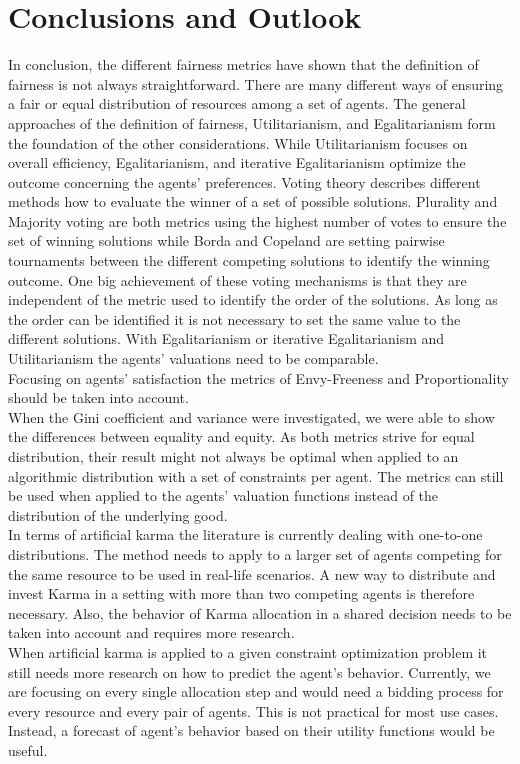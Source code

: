 \documentclass[german, a4paper, 11pt, oneside]{scrbook}
\begin{document}
\chapter{Conclusions and Outlook}
In conclusion, the different fairness metrics have shown that the definition of fairness is not always straightforward. There are many different ways of ensuring a fair or equal distribution of resources among a set of agents. The general approaches of the definition of fairness, Utilitarianism, and Egalitarianism form the foundation of the other considerations. While Utilitarianism focuses on overall efficiency, Egalitarianism, and iterative Egalitarianism optimize the outcome concerning the agents' preferences. Voting theory describes different methods how to evaluate the winner of a set of possible solutions. Plurality and Majority voting are both metrics using the highest number of votes to ensure the set of winning solutions while Borda and Copeland are setting pairwise tournaments between the different competing solutions to identify the winning outcome. One big achievement of these voting mechanisms is that they are independent of the metric used to identify the order of the solutions. As long as the order can be identified it is not necessary to set the same value to the different solutions. With Egalitarianism or iterative Egalitarianism and Utilitarianism the agents' valuations need to be comparable. \\Focusing on agents' satisfaction the metrics of Envy-Freeness and Proportionality should be taken into account.
\\When the Gini coefficient and variance were investigated, we were able to show the differences between equality and equity. As both metrics strive for equal distribution, their result might not always be optimal when applied to an algorithmic distribution with a set of constraints per agent. The metrics can still be used when applied to the agents' valuation functions instead of the distribution of the underlying good.
\\In terms of artificial karma the literature is currently dealing with one-to-one distributions. The method needs to apply to a larger set of agents competing for the same resource to be used in real-life scenarios. A new way to distribute and invest Karma in a setting with more than two competing agents is therefore necessary. Also, the behavior of Karma allocation in a shared decision needs to be taken into account and requires more research. 
\\When artificial karma is applied to a given constraint optimization problem it still needs more research on how to predict the agent's behavior. Currently, we are focusing on every single allocation step and would need a bidding process for every resource and every pair of agents. This is not practical for most use cases. Instead, a forecast of agent's behavior based on their utility functions would be useful. 
\end{document}

